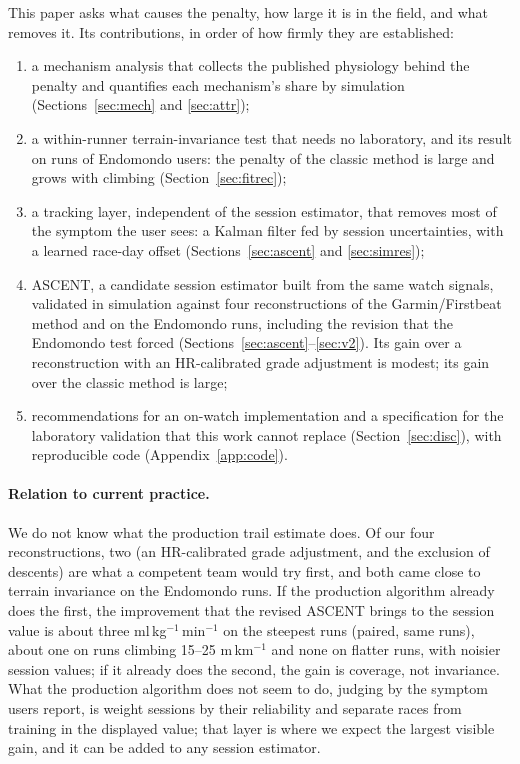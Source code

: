 \documentclass[11pt,a4paper]{article}
\newcommand{\unit}{ml\,kg$^{-1}$\,min$^{-1}$}
\newcommand{\ascent}{ASCENT}
\begin{document}
This paper asks what causes the penalty, how large it is in the field, and what removes it. Its contributions, in order of how firmly they are established:
\begin{enumerate}[leftmargin=*]
\item a mechanism analysis that collects the published physiology behind the penalty and quantifies each mechanism's share by simulation (Sections~\ref{sec:mech} and \ref{sec:attr});
\item a within-runner terrain-invariance test that needs no laboratory, and its result on \nnFitrecRuns{} runs of \nnFitrecRunners{} Endomondo users: the penalty of the classic method is large and grows with climbing (Section~\ref{sec:fitrec});
\item a tracking layer, independent of the session estimator, that removes most of the symptom the user sees: a Kalman filter fed by session uncertainties, with a learned race-day offset (Sections~\ref{sec:ascent} and \ref{sec:simres});
\item \ascent, a candidate session estimator built from the same watch signals, validated in simulation against four reconstructions of the Garmin/Firstbeat method and on the Endomondo runs, including the revision that the Endomondo test forced (Sections~\ref{sec:ascent}--\ref{sec:v2}). Its gain over a reconstruction with an HR-calibrated grade adjustment is modest; its gain over the classic method is large;
\item recommendations for an on-watch implementation and a specification for the laboratory validation that this work cannot replace (Section~\ref{sec:disc}), with reproducible code (Appendix~\ref{app:code}).
\end{enumerate}

\paragraph{Relation to current practice.} We do not know what the production trail estimate does. Of our four reconstructions, two (an HR-calibrated grade adjustment, and the exclusion of descents) are what a competent team would try first, and both came close to terrain invariance on the Endomondo runs. If the production algorithm already does the first, the improvement that the revised \ascent{} brings to the session value is about three \unit{} on the steepest runs (paired, same runs), about one on runs climbing 15--25 m\,km$^{-1}$ and none on flatter runs, with noisier session values; if it already does the second, the gain is coverage, not invariance. What the production algorithm does not seem to do, judging by the symptom users report, is weight sessions by their reliability and separate races from training in the displayed value; that layer is where we expect the largest visible gain, and it can be added to any session estimator.
\end{document}
